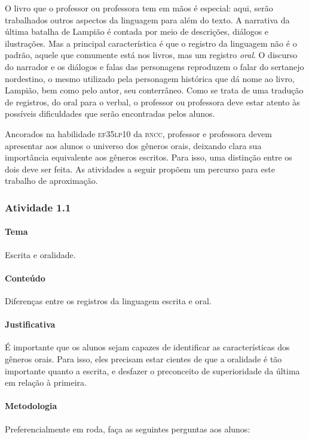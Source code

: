 \documentclass[11pt]{extarticle}
\begin{document}

O livro que o professor ou professora tem em mãos é especial:
aqui, serão trabalhados outros aspectos da linguagem para além do texto.
A narrativa da última batalha de Lampião é contada por meio de descrições, diálogos
e ilustrações. Mas a principal característica é que o registro da linguagem não é
o padrão, aquele que comumente está nos livros, mas um registro \textit{oral}.
O discurso do narrador e os diálogos e falas das personagens reproduzem o falar
do sertanejo nordestino, o mesmo utilizado pela personagem histórica que dá nome 
ao livro, Lampião, bem como pelo autor, seu conterrâneo. 
Como se trata de uma tradução de registros, do oral para o verbal, o professor
ou professora deve estar atento às possíveis dificuldades que serão encontradas pelos alunos. 

Ancorados na habilidade \textsc{ef35lp10} da \textsc{bncc}, professor e professora devem apresentar aos
alunos o universo dos gêneros orais, deixando clara sua importância equivalente aos
gêneros escritos. Para isso, uma distinção entre os dois deve ser feita. 
As atividades a seguir propõem um percurso para este trabalho de aproximação. 


\subsubsection{Atividade 1.1}


\paragraph{Tema} Escrita e oralidade.


\paragraph{Conteúdo} Diferenças entre os registros da linguagem escrita e oral. 


\paragraph{Justificativa} É importante que os alunos sejam capazes de
identificar as características dos gêneros orais. Para isso, 
eles precisam estar cientes de que a oralidade é tão importante quanto a escrita,
e desfazer o preconceito de superioridade da última em relação à primeira.


\paragraph{Metodologia} Preferencialmente em roda, faça as seguintes perguntas aos alunos: 
\end{document}
